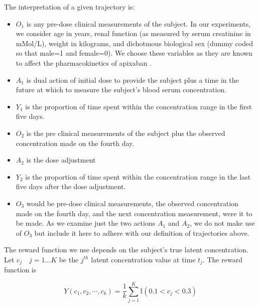 \noindent The interpretation of a given trajectory is:
\begin{itemize}
	\item $ O_1 $ is any pre-dose clinical measurements of the subject.  In our experiments, we consider age in years, renal function (as measured by serum creatinine in mMol/L), weight in kilograms, and dichotmous biological sex (dummy coded so that male=1 and female=0).  We choose these variables as they are known to affect the pharmacokinetics of apixaban \cite{byon2019apixaban}.  
	\item $ A_1 $ is dual action of initial dose to provide the subject plus a time in the future at which to measure the subject’s blood serum concentration.
	\item $ Y_1 $ is the proportion of time spent within the concentration range in the first five days.
	\item $ O_2 $ is the pre clinical measurements of the subject plus the observed concentration made on the fourth day.
	\item $ A_2 $ is the dose adjustment
	\item $ Y_2 $ is the proportion of time spent within the concentration range in the last five days after the dose adjustment.
	\item $ O_3 $ would be pre-dose clinical measurements, the observed concentration made on the fourth day, and the next concentration measurement, were it to be made. As we examine just the two actions $ A_1 $ and $ A_2 $, we do not make use of $ O_3 $ but include it here to adhere with our definition of trajectories above.
\end{itemize}

The reward function we use depends on the subject’s true latent concentration. Let $ c_j \quad j=1...K $ be the $ j^{th}$ latent concentration value at time $ t_j $.  The reward function is 

\begin{equation}
Y(c_1, c_2, \cdots, c_k) = \dfrac{1}{k}\sum_{j=1}^K \mathbb{I}(0.1 < c_j < 0.3)
\end{equation}

